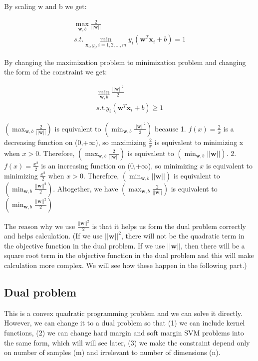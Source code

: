 \documentclass{article}
\begin{document}
By scaling w and b we get:


\begin{gather*}
\max_{\boldsymbol{w}, b} \frac{2}{||\boldsymbol{w}||} \nonumber \\
s.t. \min_{\boldsymbol{x}_i, y_i, i=1,2,...,m} y_i(\boldsymbol{w}^T\boldsymbol{x}_i + b)=1
\end{gather*}

By changing the maximization problem to minimization problem and changing the form of the constraint we get:

\begin{gather*}
\min_{\boldsymbol{w}, b} \frac{||\boldsymbol{w}||^2}{2} \nonumber \\
s.t. y_i(\boldsymbol{w}^T\boldsymbol{x}_i + b) \geq 1
\end{gather*}

$(\max_{\boldsymbol{w}, b} \frac{2}{||\boldsymbol{w}||})$ is equivalent to $(\min_{\boldsymbol{w}, b} \frac{||\boldsymbol{w}||^2}{2})$ because 1. $f(x) = \frac{2}{x}$ is a decreasing function on (0,+$\infty$), so maximizing $\frac{2}{x}$ is equivalent to minimizing x when $x>0$. Therefore, $(\max_{\boldsymbol{w}, b} \frac{2}{||\boldsymbol{w}||})$ is equivalent to $(\min_{\boldsymbol{w}, b} ||\boldsymbol{w}||)$. 2. $f(x) = \frac{x^2}{2}$ is an increasing function on (0,+$\infty$), so minimizing $x$ is equivalent to minimizing $\frac{x^2}{2}$ when $x>0$. Therefore, $(\min_{\boldsymbol{w}, b} ||\boldsymbol{w}||)$ is equivalent to $(\min_{\boldsymbol{w}, b} \frac{||\boldsymbol{w}||^2}{2})$. Altogether, we have $(\max_{\boldsymbol{w}, b} \frac{2}{||\boldsymbol{w}||})$ is equivalent to $(\min_{\boldsymbol{w}, b} \frac{||\boldsymbol{w}||^2}{2})$

The reason why we use $\frac{||\boldsymbol{w}||^2}{2}$ is that it helps us form the dual problem correctly and helps calculation. (If we use $||\boldsymbol{w}||^2$, there will not be the quadratic term in the objective function in the dual problem. If we use $||\boldsymbol{w}||$, then there will be a square root term in the objective function in the dual problem and this will make calculation more complex. We will see how these happen in the following part.)

\subsection{Dual problem}

This is a convex quadratic programming problem and we can solve it directly. However, we can change it to a dual problem so that (1) we can include kernel functions, (2) we can change hard margin and soft margin SVM problems into the same form, which will will see later, (3) we make the constraint depend only on number of samples (m) and irrelevant to number of dimensions (n).
\end{document}
